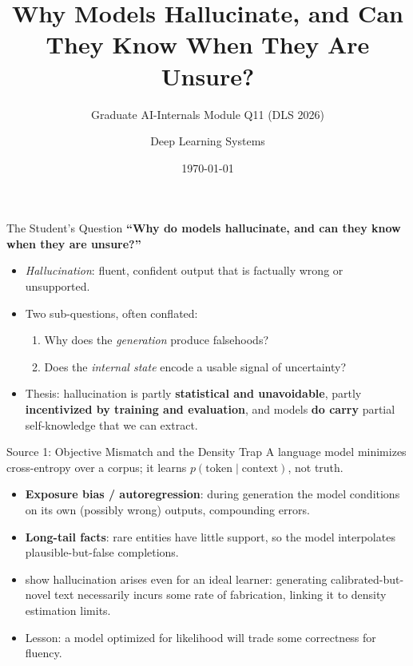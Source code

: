 \documentclass[aspectratio=169,11pt]{beamer}
\title{Why Models Hallucinate, and Can They Know When They Are Unsure?}
\subtitle{Graduate AI-Internals Module Q11 (DLS 2026)}
\author{Deep Learning Systems}
\date{\today}
\begin{document}
\begin{frame}
  \titlepage
\end{frame}

\begin{frame}{The Student's Question}
  \textbf{``Why do models hallucinate, and can they know when they are unsure?''}
  \begin{itemize}
    \item \emph{Hallucination}: fluent, confident output that is factually wrong or unsupported.
    \item Two sub-questions, often conflated:
    \begin{enumerate}
      \item Why does the \emph{generation} produce falsehoods?
      \item Does the \emph{internal state} encode a usable signal of uncertainty?
    \end{enumerate}
    \item Thesis: hallucination is partly \textbf{statistical and unavoidable}, partly \textbf{incentivized by training and evaluation}, and models \textbf{do carry} partial self-knowledge that we can extract.
  \end{itemize}
\end{frame}

\begin{frame}{Source 1: Objective Mismatch and the Density Trap}
  A language model minimizes cross-entropy over a corpus; it learns $p(\text{token}\mid\text{context})$, not truth.
  \begin{itemize}
    \item \textbf{Exposure bias / autoregression}: during generation the model conditions on its own (possibly wrong) outputs, compounding errors.
    \item \textbf{Long-tail facts}: rare entities have little support, so the model interpolates plausible-but-false completions.
    \item \citet{kalai2024calibrated} show hallucination arises even for an ideal learner: generating calibrated-but-novel text necessarily incurs some rate of fabrication, linking it to density estimation limits.
    \item Lesson: a model optimized for likelihood will trade some correctness for fluency.
  \end{itemize}
\end{frame}
\end{document}
